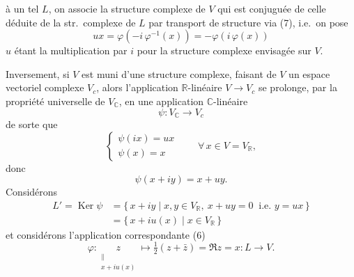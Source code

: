 \documentclass[11pt,a4paper]{article}
\begin{document}
\add{(}à un tel $L$, on associe la structure complexe de $V$    qui est conjuguée de celle déduite de la str.\ complexe de $L$ par
transport de structure via (7), i.e.\ on pose
\[
  u x = \varphi(-i\,\varphi^{-1}(x)) = -\varphi(i\,\varphi(x)) \tag{8}
\]
$u$ étant la multiplication par $i$ pour la structure complexe envisagée sur $V$.

Inversement, si $V$ est muni d'une structure complexe,  faisant de
$V$ un espace vectoriel complexe $V_c$, alors l'application 
$\mathbb{R}$-linéaire $V \to V_c$ se prolonge, par la propriété universelle de
$V_{\mathbb{C}}$, en une application $\mathbb{C}$-linéaire
\[
  \psi : V_{\mathbb{C}} \longrightarrow V_c \tag{9}
\]
de sorte que
\[
  \begin{cases}
    \psi(i x) = u x \\
    \psi(x) = x
  \end{cases}
  \qquad \forall\, x \in V = V_{\mathbb{R}}, \tag{10}
\]
donc
\[
  \psi(x + i y) = x + u y . \tag{11}
\]
  Considérons
\[
  \begin{aligned}
    L' = \operatorname{Ker} \psi
    &= \{\, x + i y \mid x, y \in V_{\mathbb{R}},\ x + u y = 0 \ \text{ i.e. } y = u x \,\} \\
    &= \{\, x + i u(x) \mid x \in V_{\mathbb{R}} \,\}
  \end{aligned} \tag{12}
\]
et considérons l'application correspondante (6)
\[
  \varphi : \underset{\substack{\| \\ x + i u(x)}}{z} \longmapsto \tfrac{1}{2}(z + \bar z) = \Re z = x : L \longrightarrow V .
\]
\end{document}
